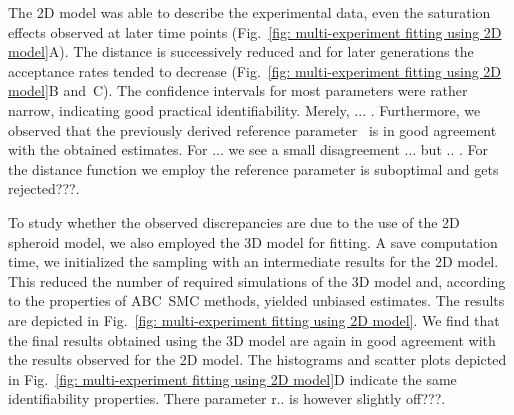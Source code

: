 \documentclass[10pt,letterpaper]{article}
\newcommand{\jh}[1]{{\color{red}#1}}
\begin{document}
The 2D model was able to describe the experimental data, even the saturation effects observed at later time points (Fig.~\ref{fig: multi-experiment fitting using 2D model}A). The distance is successively reduced and for later generations the acceptance rates tended to decrease (Fig.~\ref{fig: multi-experiment fitting using 2D model}B and~C). The confidence intervals for most parameters were rather narrow, indicating good practical identifiability. \jh{Merely, ... .} Furthermore, we observed that the previously derived reference parameter~\cite{JagiellaMul2015} is in good agreement with the obtained estimates. \jh{For ... we see a small disagreement ... but .. . For the distance function we employ the reference parameter is suboptimal and gets rejected???.}

\jh{
To study whether the observed discrepancies are due to the use of the 2D spheroid model, we also employed the 3D model for fitting. A save computation time, we initialized the sampling with an intermediate results for the 2D model. This reduced the number of required simulations of the 3D model and, according to the properties of ABC~SMC methods, yielded unbiased estimates. The results are depicted in Fig.~\ref{fig: multi-experiment fitting using 2D model}. We find that the final results obtained using the 3D model are again in good agreement with the results observed for the 2D model. The histograms and scatter plots depicted in Fig.~\ref{fig: multi-experiment fitting using 2D model}D indicate the same identifiability properties. \jh{There parameter r.. is however slightly off???.}
}
\end{document}
